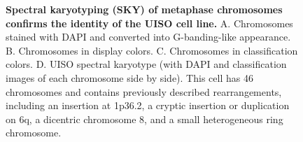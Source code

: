 \documentclass[10pt]{article}
\begin{document}
\begin{figure}[!ht]
  \begin{center}
  \end{center}
  
  \caption{
    {\bf Spectral karyotyping (SKY) of metaphase chromosomes confirms the identity of the UISO cell line.} 
    A. Chromosomes stained with DAPI and converted into G-banding-like appearance.
    B. Chromosomes in display colors.
    C. Chromosomes in classification colors.
    D. UISO spectral karyotype (with DAPI and classification images of each chromosome side by side).
    This cell has 46 chromosomes and contains previously described rearrangements, including an insertion at 1p36.2, a cryptic insertion or duplication on 6q, a dicentric chromosome 8, and a small heterogeneous ring chromosome.}

  \label{fig:sky}
\end{figure}

\clearpage



    
    
  

\clearpage
\end{document}

